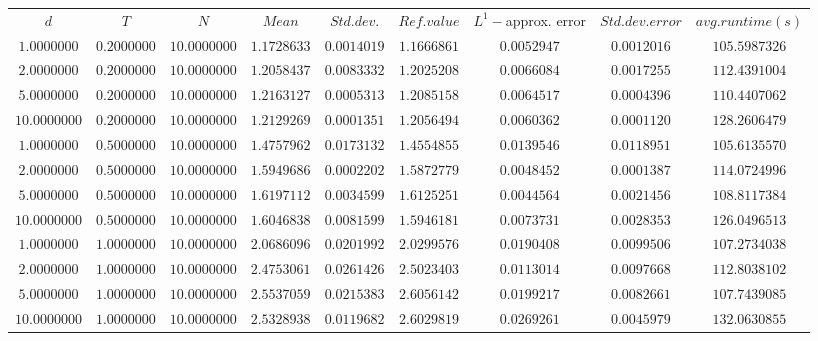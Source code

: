\begin{tabular}{ccccccccc}
$d$ & $T$ & $N$ & $Mean$ & $Std. dev.$ & $Ref. value$ & $L^1-$approx. error & $Std. dev. error$ & $avg. runtime (s)$\\
$1.0000000$ & $0.2000000$ & $10.0000000$ & $1.1728633$ & $0.0014019$ & $1.1666861$ & $0.0052947$ & $0.0012016$ & $105.5987326$\\
$2.0000000$ & $0.2000000$ & $10.0000000$ & $1.2058437$ & $0.0083332$ & $1.2025208$ & $0.0066084$ & $0.0017255$ & $112.4391004$\\
$5.0000000$ & $0.2000000$ & $10.0000000$ & $1.2163127$ & $0.0005313$ & $1.2085158$ & $0.0064517$ & $0.0004396$ & $110.4407062$\\
$10.0000000$ & $0.2000000$ & $10.0000000$ & $1.2129269$ & $0.0001351$ & $1.2056494$ & $0.0060362$ & $0.0001120$ & $128.2606479$\\
$1.0000000$ & $0.5000000$ & $10.0000000$ & $1.4757962$ & $0.0173132$ & $1.4554855$ & $0.0139546$ & $0.0118951$ & $105.6135570$\\
$2.0000000$ & $0.5000000$ & $10.0000000$ & $1.5949686$ & $0.0002202$ & $1.5872779$ & $0.0048452$ & $0.0001387$ & $114.0724996$\\
$5.0000000$ & $0.5000000$ & $10.0000000$ & $1.6197112$ & $0.0034599$ & $1.6125251$ & $0.0044564$ & $0.0021456$ & $108.8117384$\\
$10.0000000$ & $0.5000000$ & $10.0000000$ & $1.6046838$ & $0.0081599$ & $1.5946181$ & $0.0073731$ & $0.0028353$ & $126.0496513$\\
$1.0000000$ & $1.0000000$ & $10.0000000$ & $2.0686096$ & $0.0201992$ & $2.0299576$ & $0.0190408$ & $0.0099506$ & $107.2734038$\\
$2.0000000$ & $1.0000000$ & $10.0000000$ & $2.4753061$ & $0.0261426$ & $2.5023403$ & $0.0113014$ & $0.0097668$ & $112.8038102$\\
$5.0000000$ & $1.0000000$ & $10.0000000$ & $2.5537059$ & $0.0215383$ & $2.6056142$ & $0.0199217$ & $0.0082661$ & $107.7439085$\\
$10.0000000$ & $1.0000000$ & $10.0000000$ & $2.5328938$ & $0.0119682$ & $2.6029819$ & $0.0269261$ & $0.0045979$ & $132.0630855$\\
\end{tabular}

